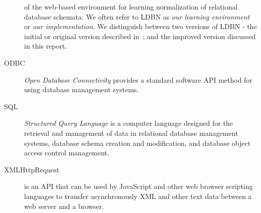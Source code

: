 \begin{description}
	  of the web-based environment for
    learning normalization of relational database schemata. We often refer to LDBN 
    as \emph{our learning environment} or \emph{our implementation}. 
    We distinguish between two versions of LDBN - 
    the initial or original version described in~\cite{mt1}; and the improved version
    discussed in this report. 
	\item[ODBC] \emph{Open Database Connectivity} provides a standard 
	  software API method for using database management systems.
	\item[SQL] \emph{Structured Query Language} is a computer language designed for 
	  the retrieval and management of data in relational database management systems, 
	  database schema creation and modification, and database object access control management.
	\item[XMLHttpRequest] is an API that can be used by JavaScript and other web browser 
	  scripting languages to transfer asynchronously XML and other 
	  text data between a web server and a browser.
\end{description}
